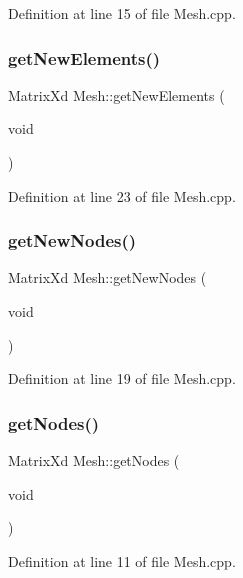 Definition at line 15 of file Mesh.\+cpp.

\mbox{\label{class_mesh_af242dbb4627c09410975a0e67389e0de}} 
\subsubsection{\texorpdfstring{get\+New\+Elements()}{getNewElements()}}
{\footnotesize\ttfamily Matrix\+Xd Mesh\+::get\+New\+Elements (\begin{DoxyParamCaption}\item[{void}]{ }\end{DoxyParamCaption})}



Definition at line 23 of file Mesh.\+cpp.

\mbox{\label{class_mesh_a52ecce406bbef80cbf3610db3ea5ea40}} 
\subsubsection{\texorpdfstring{get\+New\+Nodes()}{getNewNodes()}}
{\footnotesize\ttfamily Matrix\+Xd Mesh\+::get\+New\+Nodes (\begin{DoxyParamCaption}\item[{void}]{ }\end{DoxyParamCaption})}



Definition at line 19 of file Mesh.\+cpp.

\mbox{\label{class_mesh_a0b0f7458f07745240d9bda967cda12de}} 
\subsubsection{\texorpdfstring{get\+Nodes()}{getNodes()}}
{\footnotesize\ttfamily Matrix\+Xd Mesh\+::get\+Nodes (\begin{DoxyParamCaption}\item[{void}]{ }\end{DoxyParamCaption})}



Definition at line 11 of file Mesh.\+cpp.

